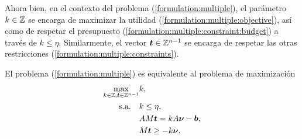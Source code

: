 Ahora bien, en el contexto del problema (\ref{formulation:multiple}), el parámetro $k \in \mathbb{Z}$ se
encarga de maximizar la utilidad (\ref{formulation:multiple:objective}), así como de respetar el
presupuesto (\ref{formulation:multiple:constraint:budget}) a través de $k \leq \eta$. Similarmente,
el vector $\boldsymbol{t} \in \mathbb{Z}^{n-1}$ se encarga de respetar las otras restricciones
(\ref{formulation:multiple:constraints}).
\begin{theorem}
	El problema (\ref{formulation:multiple}) es equivalente al problema de maximización
	\begin{subequations}
		\label{formulation:lattice}
		\begin{align}
			\max_{k \in \mathbb{Z}, \boldsymbol{t} \in \mathbb{Z}^{n-1}}
				& k, \\
			\text{s.a.} \quad
				& k \leq \eta, \label{lattice:c-layer} \\
				& AM\boldsymbol{t} = kA\boldsymbol{\nu} - \boldsymbol{b}, \label{lattice:constraints} \\
				& M\boldsymbol{t} \geq -k\boldsymbol{\nu}.
		\end{align}
	\end{subequations}
\end{theorem}
